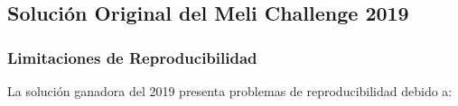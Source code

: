 \documentclass[11pt,a4paper]{article}
\begin{document}

\subsection{Solución Original del Meli Challenge 2019}

\subsubsection{Limitaciones de Reproducibilidad}

La solución ganadora del 2019 \cite{winner2019} presenta problemas de reproducibilidad debido a:
\end{document}
